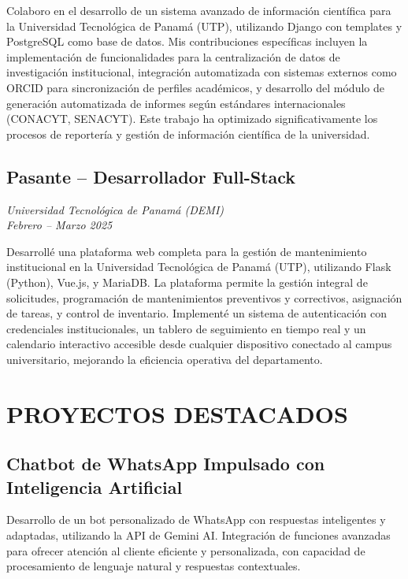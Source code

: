 \documentclass[11pt,a4paper]{article}
\begin{document}
Colaboro en el desarrollo de un sistema avanzado de información científica para la Universidad Tecnológica de Panamá (UTP), utilizando Django con templates y PostgreSQL como base de datos. Mis contribuciones específicas incluyen la implementación de funcionalidades para la centralización de datos de investigación institucional, integración automatizada con sistemas externos como ORCID para sincronización de perfiles académicos, y desarrollo del módulo de generación automatizada de informes según estándares internacionales (CONACYT, SENACYT). Este trabajo ha optimizado significativamente los procesos de reportería y gestión de información científica de la universidad.

\vspace{4pt}

\subsection*{Pasante -- Desarrollador Full-Stack}
\textit{Universidad Tecnológica de Panamá (DEMI)}\\
\textit{Febrero -- Marzo 2025}

Desarrollé una plataforma web completa para la gestión de mantenimiento institucional en la Universidad Tecnológica de Panamá (UTP), utilizando Flask (Python), Vue.js, y MariaDB. La plataforma permite la gestión integral de solicitudes, programación de mantenimientos preventivos y correctivos, asignación de tareas, y control de inventario. Implementé un sistema de autenticación con credenciales institucionales, un tablero de seguimiento en tiempo real y un calendario interactivo accesible desde cualquier dispositivo conectado al campus universitario, mejorando la eficiencia operativa del departamento.

\section*{PROYECTOS DESTACADOS}

\subsection*{Chatbot de WhatsApp Impulsado con Inteligencia Artificial}
Desarrollo de un bot personalizado de WhatsApp con respuestas inteligentes y adaptadas, utilizando la API de Gemini AI. Integración de funciones avanzadas para ofrecer atención al cliente eficiente y personalizada, con capacidad de procesamiento de lenguaje natural y respuestas contextuales.
\end{document}
